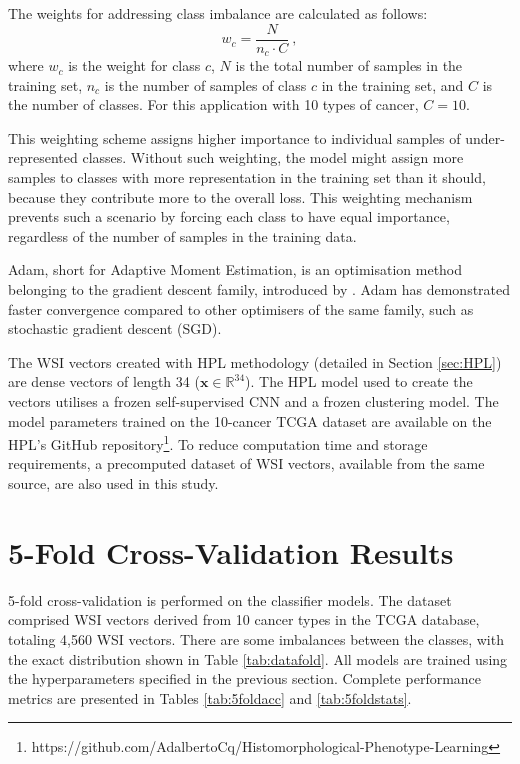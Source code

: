 \documentclass{l4proj}
\begin{document}
The weights for addressing class imbalance are calculated as follows:
\begin{equation}
    w_c = \frac{N}{n_c \cdot C}\ ,
\end{equation}
where $w_c$ is the weight for class $c$, $N$ is the total number of samples in the training set, $n_c$ is the number of samples of class $c$ in the training set, and $C$ is the number of classes. For this application with 10 types of cancer, $C = 10$.

This weighting scheme assigns higher importance to individual samples of under-represented classes. Without such weighting, the model might assign more samples to classes with more representation in the training set than it should, because they contribute more to the overall loss. This weighting mechanism prevents such a scenario by forcing each class to have equal importance, regardless of the number of samples in the training data.

Adam, short for Adaptive Moment Estimation, is an optimisation method belonging to the gradient descent family, introduced by \cite{kingma2017}. Adam has demonstrated faster convergence compared to other optimisers of the same family, such as stochastic gradient descent (SGD).

The WSI vectors created with HPL methodology (detailed in Section \ref{sec:HPL}) are dense vectors of length 34 ($\mathbf{x} \in \mathbb{R}^{34}$). The HPL model used to create the vectors utilises a frozen self-supervised CNN and a frozen clustering model. The model parameters trained on the 10-cancer TCGA dataset are available on the HPL's GitHub repository\footnote{https://github.com/AdalbertoCq/Histomorphological-Phenotype-Learning}. To reduce computation time and storage requirements, a precomputed dataset of WSI vectors, available from the same source, are also used in this study.

\section{5-Fold Cross-Validation Results} \label{sec:5fold}
5-fold cross-validation is performed on the classifier models. The dataset comprised WSI vectors derived from 10 cancer types in the TCGA database, totaling 4,560 WSI vectors. There are some imbalances between the classes, with the exact distribution shown in Table \ref{tab:datafold}. All models are trained using the hyperparameters specified in the previous section. Complete performance metrics are presented in Tables \ref{tab:5foldacc} and \ref{tab:5foldstats}.
\end{document}
